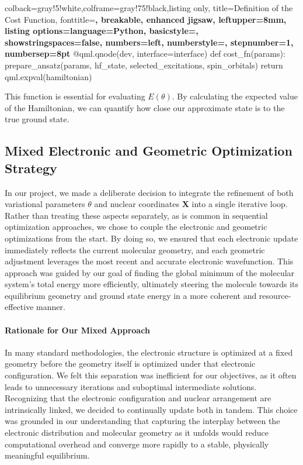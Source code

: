   \begin{tcblisting}{colback=gray!5!white,colframe=gray!75!black,listing only,
    title=Definition of the Cost Function, fonttitle=\bfseries, breakable, enhanced jigsaw, leftupper=8mm,
    listing options={language=Python, basicstyle=\ttfamily\small,
    showstringspaces=false, numbers=left, numberstyle=\footnotesize, stepnumber=1, numbersep=8pt}}
@qml.qnode(dev, interface=interface)
def cost_fn(params):
    prepare_ansatz(params, hf_state, selected_excitations, spin_orbitals)
    return qml.expval(hamiltonian)
  \end{tcblisting}
  
This function is essential for evaluating \(E(\theta)\). By calculating the expected value of the Hamiltonian, we can quantify how close our approximate state is to the true ground state.

\subsection{Mixed Electronic and Geometric Optimization Strategy}

In our project, we made a deliberate decision to integrate the refinement of both variational parameters \(\theta\) and nuclear coordinates \(\mathbf{X}\) into a single iterative loop. Rather than treating these aspects separately, as is common in sequential optimization approaches, we chose to couple the electronic and geometric optimizations from the start. By doing so, we ensured that each electronic update immediately reflects the current molecular geometry, and each geometric adjustment leverages the most recent and accurate electronic wavefunction. This approach was guided by our goal of finding the global minimum of the molecular system’s total energy more efficiently, ultimately steering the molecule towards its equilibrium geometry and ground state energy in a more coherent and resource-effective manner.

\paragraph{Rationale for Our Mixed Approach}
In many standard methodologies, the electronic structure is optimized at a fixed geometry before the geometry itself is optimized under that electronic configuration. We felt this separation was inefficient for our objectives, as it often leads to unnecessary iterations and suboptimal intermediate solutions. Recognizing that the electronic configuration and nuclear arrangement are intrinsically linked, we decided to continually update both in tandem. This choice was grounded in our understanding that capturing the interplay between the electronic distribution and molecular geometry as it unfolds would reduce computational overhead and converge more rapidly to a stable, physically meaningful equilibrium.

